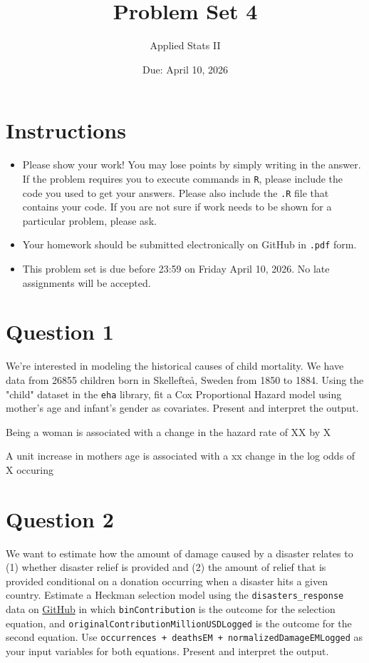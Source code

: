 \documentclass[12pt,letterpaper]{article}
\title{Problem Set 4}
\date{Due: April 10, 2026}
\author{Applied Stats II}
\begin{document}
	\maketitle
	\section*{Instructions}
	\begin{itemize}
		\item Please show your work! You may lose points by simply writing in the answer. If the problem requires you to execute commands in \texttt{R}, please include the code you used to get your answers. Please also include the \texttt{.R} file that contains your code. If you are not sure if work needs to be shown for a particular problem, please ask.
		\item Your homework should be submitted electronically on GitHub in \texttt{.pdf} form.
		\item This problem set is due before 23:59 on Friday April 10, 2026. No late assignments will be accepted.
		
	\end{itemize}
	
	\vspace{.25cm}
	\section*{Question 1}
	\vspace{.25cm}
	\noindent We're interested in modeling the historical causes of child mortality. We have data from 26855 children born in Skellefteå, Sweden from 1850 to 1884. Using the "child" dataset in the \texttt{eha} library, fit a Cox Proportional Hazard model using mother's age and infant's gender as covariates. Present and interpret the output.
	
	
	Being a woman is associated with a change in the hazard rate of XX by X
	
	A unit increase in mothers age is associated with a xx change in the log odds of X occuring
	
	\section*{Question 2}
	\vspace{.25cm}
	\noindent We want to estimate how the amount of damage caused by a disaster relates to (1) whether disaster relief is provided and (2) the amount of relief that is provided  conditional on a donation occurring when a disaster hits a given country. Estimate a Heckman selection model using the \texttt{disasters\_response} data on \href{https://raw.githubusercontent.com/ASDS-TCD/StatsII_2026/refs/heads/main/datasets/disaster_response.csv}{GitHub} in which \texttt{binContribution} is the outcome for the selection equation, and \texttt{originalContributionMillionUSDLogged} is the outcome for the second equation. Use \texttt{occurrences  + deathsEM + normalizedDamageEMLogged} as your input variables for both equations. Present and interpret the output.
	
\end{document}
